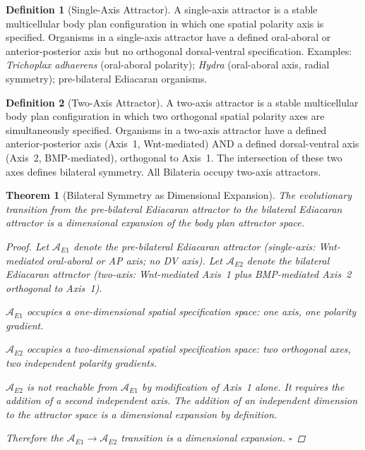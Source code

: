 \documentclass[12pt, a4paper]{article}
\newtheorem{theorem}{Theorem}[section]
\theoremstyle{definition}
\newtheorem{definition}{Definition}[section]
\theoremstyle{remark}
\begin{document}
\begin{definition}[Single-Axis Attractor]
A single-axis attractor is a stable multicellular body plan
configuration in which one spatial polarity axis is
specified. Organisms in a single-axis attractor have a
defined oral-aboral or anterior-posterior axis but no
orthogonal dorsal-ventral specification. Examples:
\textit{Trichoplax adhaerens} (oral-aboral polarity);
\textit{Hydra} (oral-aboral axis, radial symmetry);
pre-bilateral Ediacaran organisms.
\end{definition}

\begin{definition}[Two-Axis Attractor]
A two-axis attractor is a stable multicellular body plan
configuration in which two orthogonal spatial polarity axes
are simultaneously specified. Organisms in a two-axis
attractor have a defined anterior-posterior axis (Axis~1,
Wnt-mediated) AND a defined dorsal-ventral axis (Axis~2,
BMP-mediated), orthogonal to Axis~1. The intersection of
these two axes defines bilateral symmetry. All Bilateria
occupy two-axis attractors.
\end{definition}

\begin{theorem}[Bilateral Symmetry as Dimensional Expansion]
\label{thm:bilateral}
The evolutionary transition from the pre-bilateral
Ediacaran attractor to the bilateral Ediacaran attractor
is a dimensional expansion of the body plan attractor
space.

\begin{proof}
Let $\mathcal{A}_{E1}$ denote the pre-bilateral Ediacaran
attractor (single-axis: Wnt-mediated oral-aboral or AP
axis; no DV axis). Let $\mathcal{A}_{E2}$ denote the
bilateral Ediacaran attractor (two-axis: Wnt-mediated
Axis~1 plus BMP-mediated Axis~2 orthogonal to Axis~1).

$\mathcal{A}_{E1}$ occupies a one-dimensional spatial
specification space: one axis, one polarity gradient.

$\mathcal{A}_{E2}$ occupies a two-dimensional spatial
specification space: two orthogonal axes, two independent
polarity gradients.

$\mathcal{A}_{E2}$ is not reachable from $\mathcal{A}_{E1}$
by modification of Axis~1 alone. It requires the addition of
a second independent axis. The addition of an independent
dimension to the attractor space is a dimensional expansion
by definition.

Therefore the $\mathcal{A}_{E1} \to \mathcal{A}_{E2}$
transition is a dimensional expansion. $\square$
\end{proof}
\end{theorem}
\end{document}

